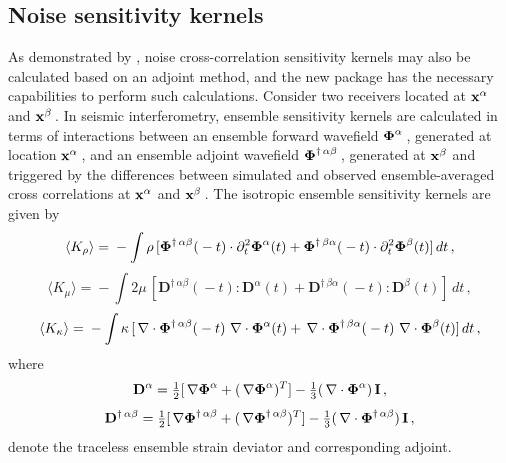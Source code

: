 \documentclass[referee,extra]{gji}
\newcommand{\bnabla}{ \, {\bf \nabla } }
\newcommand{\bx}{ {\bf x } }
\renewcommand{\cite}[1]{\citet{#1}}
\begin{document}
\subsection{Noise sensitivity kernels}\label{subsec:noisekernels}

\newcommand{\bfPhi}{\mbox{\boldmath $\bf \Phi$}}
\def\bfD{{\mathbf{D}}}
\def\bfI{{\mathbf{I}}}

As demonstrated by \cite{trompetal2010},
noise cross-correlation sensitivity kernels may also be calculated based on an adjoint method,
and the new package has the necessary capabilities to perform such calculations.
Consider two receivers located at $\bx^\alpha$ and $\bx^\beta$\,.
In seismic interferometry,
ensemble sensitivity kernels are calculated in terms of interactions between an
ensemble forward wavefield $\bfPhi^{\alpha}$\,,
generated at location $\bx^\alpha$\,,
and an ensemble adjoint wavefield $\bfPhi^{\dagger\,\alpha\beta}$\,,
generated at $\bx^\beta$ and
triggered by the differences between simulated and observed ensemble-averaged cross correlations
at $\bx^\alpha$ and $\bx^\beta$\,.
The isotropic ensemble sensitivity kernels are given by
\begin{equation}
\langle K_\rho\rangle=\mbox{}-\int\rho\,[\bfPhi^{\dagger\,\alpha\beta}(\mbox{}-t)\cdot\partial_t^2\bfPhi^{\alpha}(t)
+\bfPhi^{\dagger\,\beta\alpha}(\mbox{}-t)\cdot\partial_t^2\bfPhi^{\beta}(t)]\,d t
\,,
\label{eq:K_rho}
\end{equation}
\begin{equation}
\langle K_\mu\rangle=\mbox{}-\int 2\mu\,[\bfD^{\dagger\,\alpha\beta}(\mbox{}-t)\!:\!\bfD^\alpha(t)
+\bfD^{\dagger\,\beta\alpha}(\mbox{}-t)\!:\!\bfD^\beta(t)]\,d t
\,,
\label{eq:K_mu}
\end{equation}
\begin{equation}
\langle K_\kappa\rangle=\mbox{}-\int\kappa\,[\bnabla\cdot\bfPhi^{\dagger\,\alpha\beta}(\mbox{}-t)\,\bnabla\cdot\bfPhi^{\alpha}(t)
+ \bnabla\cdot\bfPhi^{\dagger\,\beta\alpha}(\mbox{}-t)\,\bnabla\cdot\bfPhi^{\beta}(t)]\,d t
\,,
\label{eq:K_kappa}
\end{equation}
where
\begin{equation}
\bfD^\alpha=\tfrac{1}{2}[\bnabla\bfPhi^\alpha+(\bnabla\bfPhi^\alpha)^T]-\tfrac{1}{3}(\bnabla\cdot\bfPhi^\alpha)\,\bfI
\,,
\end{equation}
\begin{equation}
\bfD^{\dagger\,\alpha\beta}=\tfrac{1}{2}[\bnabla\bfPhi^{\dagger\,\alpha\beta}+(\bnabla\bfPhi^{\dagger\,\alpha\beta})^T]
-\tfrac{1}{3}(\bnabla\cdot\bfPhi^{\dagger\,\alpha\beta})\,\bfI
\,,
\end{equation}
denote the traceless
ensemble strain deviator and corresponding adjoint.
\end{document}
